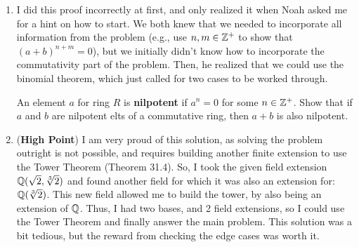 \begin{enumerate}[label=\textbf{\arabic*.}]
    \item I did this proof incorrectly at first, and only realized it when Noah asked me for a hint on how to start. We both knew that we needed to incorporate all information from the problem (e.g., use \(n,m \in \mathbb{Z}^{+}\) to show that \((a + b)^{n + m} = 0\)), but we initially didn't know how to incorporate the commutativity part of the problem. Then, he realized that we could use the binomial theorem, which just called for two cases to be worked through. 

    \begin{problem}
        An element \(a\) for ring \(R\) is \textbf{nilpotent} if \(a^{n} = 0\) for some \(n \in \mathbb{Z}^{+}\). Show that if \(a\) and \(b\) are nilpotent elts of a commutative ring, then \(a + b\) is also nilpotent.
    \end{problem}
    \newpage
    \item (\textbf{High Point}) I am very proud of this solution, as solving the problem outright is not possible, and requires building another finite extension to use the Tower Theorem (Theorem 31.4). So, I took the given field extension \(\mathbb{Q}(\sqrt{2}, \sqrt[3]{2})\) and found another field for which it was also an extension for: \(\mathbb{Q}(\sqrt[3]{2})\). This new field allowed me to build the tower, by also being an extension of \(\mathbb{Q}\). Thus, I had two bases, and 2 field extensions, so I could use the Tower Theorem and finally answer the main problem. This solution was a bit tedious, but the reward from checking the edge cases was worth it.


\end{enumerate}
